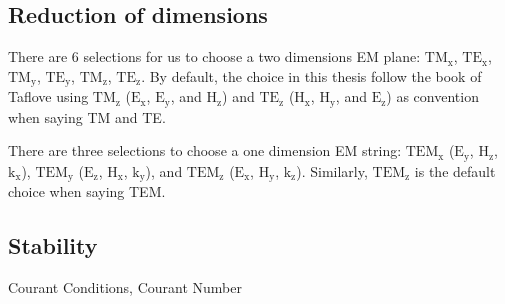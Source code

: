\subsection{Reduction of dimensions}

There are 6 selections for us to choose a two dimensions EM plane: $\mathrm{TM_{x}} $, $\mathrm{TE_{x}}$,
$\mathrm{TM_{y}}$, $\mathrm{TE_{y}}$, $\mathrm{TM_{z}}$, $\mathrm{TE_{z}}$. By default, the choice in this thesis follow
the book of Taflove using $\mathrm{TM_{z}}$ ($\mathrm{E_x}$, $\mathrm{E_y}$, and $\mathrm{H_z}$) and $\mathrm{TE_{z}}$
($\mathrm{H_x}$, $\mathrm{H_y}$, and $\mathrm{E_z}$) as convention when saying TM and TE.

There are three selections to choose a one dimension EM string: $\mathrm{TEM_x}$ ($\mathrm{E_{y}}$, $\mathrm{H_{z}}$,
$\mathrm{k_x}$), $\mathrm{TEM_y}$ ($\mathrm{E_z}$, $\mathrm{H_x}$, $\mathrm{k_y}$), and $\mathrm{TEM_z}$
($\mathrm{E_x}$, $\mathrm{H_y}$, $\mathrm{k_z}$). Similarly, $\mathrm{TEM_z}$ is the default choice when saying TEM.


\subsection{Stability}
Courant Conditions, Courant Number
